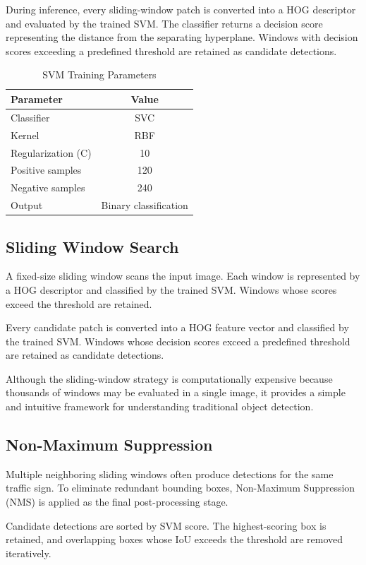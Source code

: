 \documentclass[11pt,a4paper,twoside]{article}
\begin{document}
During inference, every sliding-window patch is converted into a HOG descriptor and evaluated by the trained SVM. The classifier returns a decision score representing the distance from the separating hyperplane. Windows with decision scores exceeding a predefined threshold are retained as candidate detections.
\begin{table}[ht]
\centering
\caption{SVM Training Parameters}
\label{tab:svm}
\begin{tabular}{lc}
\hline
Parameter & Value\\
\hline
Classifier & SVC\\
Kernel & RBF\\
Regularization (C) & 10\\
Positive samples & 120\\
Negative samples & 240\\
Output & Binary classification\\
\hline
\end{tabular}
\end{table}
\subsection{Sliding Window Search}

A fixed-size sliding window scans the input image. Each window is represented by a HOG descriptor and classified by the trained SVM. Windows whose scores exceed the threshold are retained.

Every candidate patch is converted into a HOG feature vector and classified by the trained SVM. Windows whose decision scores exceed a predefined threshold are retained as candidate detections.

Although the sliding-window strategy is computationally expensive because thousands of windows may be evaluated in a single image, it provides a simple and intuitive framework for understanding traditional object detection.
\subsection{Non-Maximum Suppression}

Multiple neighboring sliding windows often produce detections for the same traffic sign. To eliminate redundant bounding boxes, Non-Maximum Suppression (NMS) is applied as the final post-processing stage.

Candidate detections are sorted by SVM score. The highest-scoring box is retained, and overlapping boxes whose IoU exceeds the threshold are removed iteratively.
\end{document}
